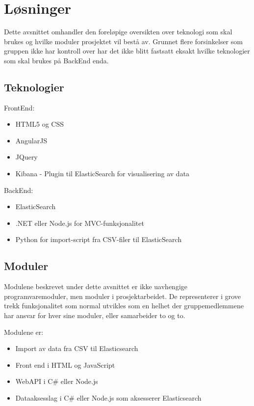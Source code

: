 \chapter{Løsninger}
Dette avsnittet omhandler den foreløpige oversikten over teknologi som skal brukes og hvilke moduler prosjektet vil bestå av. Grunnet flere forsinkelser som gruppen ikke har kontroll over har det ikke blitt fastsatt eksakt hvilke teknologier som skal brukes på BackEnd enda.


\section{Teknologier}
FrontEnd:
\begin{itemize}
\item HTML5 og CSS
\item AngularJS
\item JQuery
\item Kibana - Plugin til ElasticSearch for visualisering av data
\end{itemize}

BackEnd:
\begin{itemize}
\item ElasticSearch
\item .NET eller Node.js for MVC-funksjonalitet
\item Python for import-script fra CSV-filer til ElasticSearch
\end{itemize}

\section{Moduler}
Modulene beskrevet under dette avsnittet er ikke uavhengige programvaremoduler, men moduler i prosjektarbeidet. De representerer i grove trekk funksjonalitet som normal utvikles som en helhet der gruppemedlemmene har ansvar for hver sine moduler, eller samarbeider to og to.

Modulene er:
\begin{itemize}
\item Import av data fra CSV til Elasticsearch
\item Front end i HTML og JavaScript
\item WebAPI i C\# eller Node.js
\item Dataaksesslag i C\# eller Node.js som aksesserer Elasticsearch
\end{itemize}
